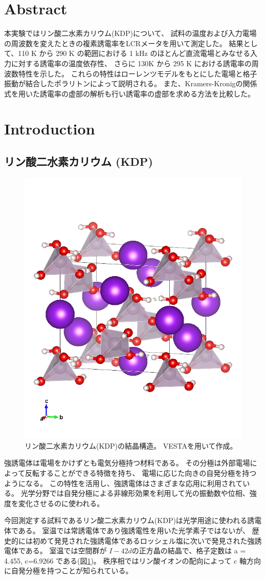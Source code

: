 \documentclass[9pt,dvipdfmx,a4paper]{jsarticle}
\begin{document}

\section{Abstract}
本実験ではリン酸二水素カリウム(KDP)について、
試料の温度および入力電場の周波数を変えたときの複素誘電率をLCRメータを用いて測定した。
結果として、110 K から 290 K の範囲における 1 kHz のほとんど直流電場とみなせる入力に対する誘電率の温度依存性、
さらに 130K から 295 K における誘電率の周波数特性を示した。
これらの特性はローレンツモデルをもとにした電場と格子振動が結合したポラリトンによって説明される。
また、Kramers-Kronigの関係式を用いた誘電率の虚部の解析も行い誘電率の虚部を求める方法を比較した。

\section{Introduction}
\subsection*{リン酸二水素カリウム (KDP)}
\begin{figure}
    \centering
    \includegraphics[width = 0.3\columnwidth]{KDP_tetragonal.png}
    \caption{\small{リン酸二水素カリウム(KDP)の結晶構造\cite{cif:7020834}。
    VESTAを用いて作成\cite{VESTA}。}}
    \label{fig:KDP_lattice}
\end{figure}
強誘電体は電場をかけずとも電気分極持つ材料である。
その分極は外部電場によって反転することができる特徴を持ち、
電場に応じた向きの自発分極を持つようになる。
この特性を活用し、強誘電体はさまざまな応用に利用されている。
光学分野では自発分極による非線形効果を利用して光の振動数や位相、強度を変化させるのに使われる。

今回測定する試料であるリン酸二水素カリウム(KDP)は光学用途に使われる誘電体である。
室温では常誘電体であり強誘電性を用いた光学素子ではないが、
歴史的には初めて発見された強誘電体であるロッシェル塩に次いで発見された強誘電体である。
室温では空間群が \(I-4 2 d\)の正方晶の結晶で、格子定数は a = 4.455, c=6.9266 である(図\ref{fig:KDP_lattice})。
秩序相ではリン酸イオンの配向によって c 軸方向に自発分極を持つことが知られている\cite{onodera}。
\end{document}
